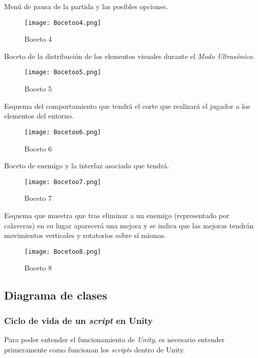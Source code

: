 Menú de pausa de la partida y las posibles opciones.

\begin{figure}[H]
    \centering
    \texttt{[image: Bocetoo4.png]}
    \caption{Boceto 4}
\end{figure}

Boceto de la distribución de los elementos visuales durante el \textit{Modo Ultrasónico}.

\begin{figure}[H]
    \centering
    \texttt{[image: Bocetoo5.png]}
    \caption{Boceto 5}
\end{figure}

Esquema del comportamiento que tendrá el corte que realizará el jugador a los elementos del entorno.

\begin{figure}[H]
    \centering
    \texttt{[image: Bocetoo6.png]}
    \caption{Boceto 6}
\end{figure}

Boceto de enemigo y la interfaz asociada que tendrá.

\begin{figure}[H]
    \centering
    \texttt{[image: Bocetoo7.png]}
    \caption{Boceto 7}
\end{figure}

Esquema que muestra que tras eliminar a un enemigo (representado por calaveras) en su lugar aparecerá una mejora y se indica que las mejoras tendrán movimientos verticales y rotatorios sobre sí mismas.

\begin{figure}[H]
    \centering
    \texttt{[image: Bocetoo8.png]}
    \caption{Boceto 8}
\end{figure}

\subsection{Diagrama de clases}

\subsubsection{Ciclo de vida de un \textit{script} en Unity}

Para poder entender el funcionamiento de \textit{Unity}, es necesario entender primeramente como funcionan los \textit{scripts} dentro de Unity.

